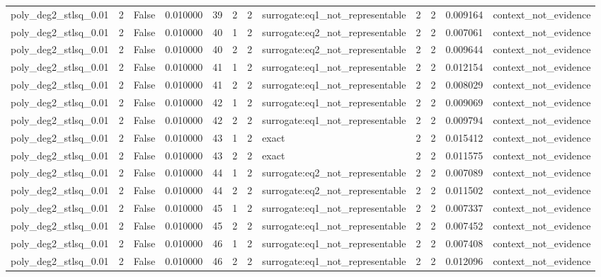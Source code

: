 \begin{tabular}{lrrrrrrlrrrl}
poly\_deg2\_stlsq\_0.01 & 2 & False & 0.010000 & 39 & 2 & 2 & surrogate:eq1\_not\_representable & 2 & 2 & 0.009164 & context\_not\_evidence \\
poly\_deg2\_stlsq\_0.01 & 2 & False & 0.010000 & 40 & 1 & 2 & surrogate:eq2\_not\_representable & 2 & 2 & 0.007061 & context\_not\_evidence \\
poly\_deg2\_stlsq\_0.01 & 2 & False & 0.010000 & 40 & 2 & 2 & surrogate:eq2\_not\_representable & 2 & 2 & 0.009644 & context\_not\_evidence \\
poly\_deg2\_stlsq\_0.01 & 2 & False & 0.010000 & 41 & 1 & 2 & surrogate:eq1\_not\_representable & 2 & 2 & 0.012154 & context\_not\_evidence \\
poly\_deg2\_stlsq\_0.01 & 2 & False & 0.010000 & 41 & 2 & 2 & surrogate:eq1\_not\_representable & 2 & 2 & 0.008029 & context\_not\_evidence \\
poly\_deg2\_stlsq\_0.01 & 2 & False & 0.010000 & 42 & 1 & 2 & surrogate:eq1\_not\_representable & 2 & 2 & 0.009069 & context\_not\_evidence \\
poly\_deg2\_stlsq\_0.01 & 2 & False & 0.010000 & 42 & 2 & 2 & surrogate:eq1\_not\_representable & 2 & 2 & 0.009794 & context\_not\_evidence \\
poly\_deg2\_stlsq\_0.01 & 2 & False & 0.010000 & 43 & 1 & 2 & exact & 2 & 2 & 0.015412 & context\_not\_evidence \\
poly\_deg2\_stlsq\_0.01 & 2 & False & 0.010000 & 43 & 2 & 2 & exact & 2 & 2 & 0.011575 & context\_not\_evidence \\
poly\_deg2\_stlsq\_0.01 & 2 & False & 0.010000 & 44 & 1 & 2 & surrogate:eq2\_not\_representable & 2 & 2 & 0.007089 & context\_not\_evidence \\
poly\_deg2\_stlsq\_0.01 & 2 & False & 0.010000 & 44 & 2 & 2 & surrogate:eq2\_not\_representable & 2 & 2 & 0.011502 & context\_not\_evidence \\
poly\_deg2\_stlsq\_0.01 & 2 & False & 0.010000 & 45 & 1 & 2 & surrogate:eq1\_not\_representable & 2 & 2 & 0.007337 & context\_not\_evidence \\
poly\_deg2\_stlsq\_0.01 & 2 & False & 0.010000 & 45 & 2 & 2 & surrogate:eq1\_not\_representable & 2 & 2 & 0.007452 & context\_not\_evidence \\
poly\_deg2\_stlsq\_0.01 & 2 & False & 0.010000 & 46 & 1 & 2 & surrogate:eq1\_not\_representable & 2 & 2 & 0.007408 & context\_not\_evidence \\
poly\_deg2\_stlsq\_0.01 & 2 & False & 0.010000 & 46 & 2 & 2 & surrogate:eq1\_not\_representable & 2 & 2 & 0.012096 & context\_not\_evidence \\

\end{tabular}

